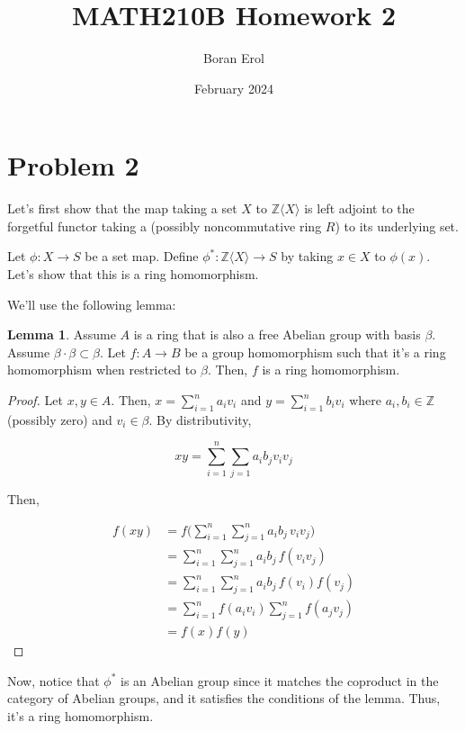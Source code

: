 \documentclass{article}
\title{MATH210B Homework 2}
\date{February 2024}
\author{Boran Erol}
\theoremstyle{definition}
\newtheorem{lemma}[theorem]{Lemma}
\begin{document}
\maketitle

\section{Problem 2}

Let's first show that the map taking a set $ X $ to $ \mathbb{Z} \langle X \rangle $
is left adjoint to the forgetful functor taking a (possibly noncommutative ring $ R $)
to its underlying set.

Let $ \phi : X \to S $ be a set map. Define $ \phi^{*} : \mathbb{Z} \langle X \rangle \to S $
by taking $ x \in X $ to $ \phi(x) $. Let's show that this is a ring homomorphism.

We'll use the following lemma:

\begin{lemma}
    Assume $ A $ is a ring that is also a free Abelian group with basis $ \beta $.
    Assume $ \beta \cdot \beta \subset \beta $.
    Let $ f : A \to B $ be a group homomorphism such that it's a ring homomorphism when restricted
    to $ \beta $. Then, $ f $ is a ring homomorphism. 
\end{lemma}
\begin{proof}
    Let $ x,y \in A $. Then, $ x = \sum_{i = 1}^{n} a_{i}v_{i} $ and $ y = \sum_{i = 1}^{n} b_{i}v_{i} $
    where $ a_{i}, b_{i} \in \mathbb{Z} $ (possibly zero) and $ v_{i} \in \beta $. By distributivity,

    \[ xy = \sum_{i = 1}^{n}\sum_{j = 1} a_{i}b_{j} v_{i}v_{j} \]

    Then,

    \begin{align*}
        f(xy) &= f\Biggl(\sum_{i=1}^{n}\sum_{j=1}^{n} a_i b_j\, v_i v_j\Biggr)\\
              &= \sum_{i=1}^{n}\sum_{j=1}^{n} a_i b_j\, f(v_i v_j)\\
              &= \sum_{i=1}^{n}\sum_{j=1}^{n} a_i b_j\, f(v_i) f(v_j)\\
              &= \sum_{i=1}^{n} f(a_{i}{v_{i}}) \sum_{j=1}^{n} f(a_{j}v_j)\\
              &= f(x)f(y)
    \end{align*}
\end{proof}

Now, notice that $ \phi^{*} $ is an Abelian group since it matches the coproduct in the category
of Abelian groups, and it satisfies the conditions of the lemma. Thus, it's a ring homomorphism.
\end{document}
